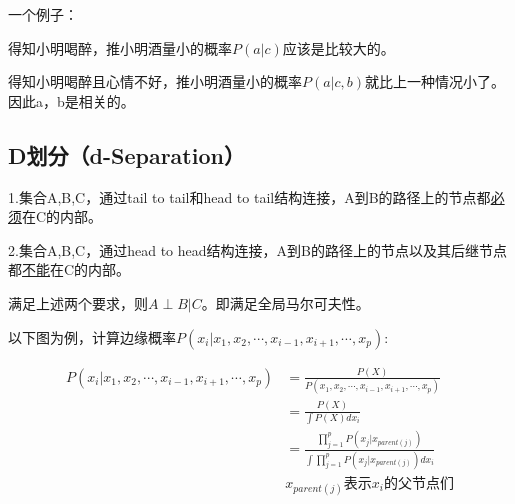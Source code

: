 \documentclass[UTF8]{ctexart} %
\begin{document}
			一个例子：
			\begin{figure}[H]
			\end{figure}
			得知小明喝醉，推小明酒量小的概率$P(a|c)$应该是比较大的。
			
			得知小明喝醉且心情不好，推小明酒量小的概率$P(a|c,b)$就比上一种情况小了。因此a，b是相关的。
			
		\subsection{D划分（d-Separation）}
			1.集合A,B,C，通过tail to tail和head to tail结构连接，A到B的路径上的节点都\uline{必须}在C的内部。
			
			2.集合A,B,C，通过head to head结构连接，A到B的路径上的节点以及其后继节点都\uline{不能}在C的内部。
			
			满足上述两个要求，则$A\perp B|C$。即满足全局马尔可夫性。
			
			以下图为例，计算边缘概率$P(x_i|x_1,x_2,\cdots,x_{i-1},x_{i+1},\cdots, x_p)$:
			\begin{figure}[H]
			\end{figure}
			\[\begin{aligned}
			P(x_i|x_1,x_2,\cdots,x_{i-1},x_{i+1},\cdots, x_p) &= \frac{P(X)}{P(x_1,x_2,\cdots,x_{i-1},x_{i+1},\cdots, x_p)}\\
			&=\frac{P(X)}{\int P(X)dx_i}\\
			&=\frac{\prod_{j=1}^pP(x_j|x_{parent(j)})}{\int \prod_{j=1}^pP(x_j|x_{parent(j)})dx_i}\\
			&x_{parent(j)}\text{表示}x_i\text{的父节点们}
			\end{aligned}\]			
			
\end{document}
